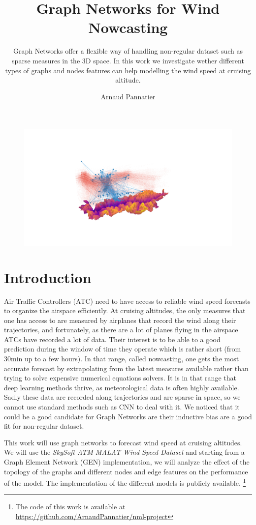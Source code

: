 \documentclass[a4paper,10pt]{article}
\title{Graph Networks for Wind Nowcasting}
\subtitle{ Graph Networks offer a flexible way of handling non-regular dataset such as sparse measures in the 3D space. In this work we investigate wether different types of graphs and nodes features can help modelling the wind speed at cruising altitude.}
\author{Arnaud Pannatier}
\begin{document}
\maketitle

\begin{figure}[htbp]
  \centering
  \includegraphics[trim={350 200 450 150},clip,width=\textwidth]{figs/south-gen.png}
\end{figure}

\newpage
\section{Introduction}
Air Traffic Controllers (ATC) need to have access to reliable wind speed forecasts to organize the airspace efficiently. At cruising altitudes, the only measures that one has access to are measured by airplanes that record the wind along their trajectories, and fortunately, as there are a lot of planes flying in the airspace ATCs have recorded a lot of data. Their interest is to be able to a good prediction during the window of time they operate which is rather short (from 30min up to a few hours). In that range, called nowcasting, one gets the most accurate forecast by extrapolating from the latest measures available rather than trying to solve expensive numerical equations solvers.
It is in that range that deep learning methods thrive, as meteorological data is often highly available. Sadly these data are recorded along trajectories and are sparse in space, so we cannot use standard methods such as CNN to deal with it. We noticed that it could be a good candidate for Graph Networks are their inductive bias are a good fit for non-regular dataset.

This work will use graph networks to forecast wind speed at cruising altitudes. We will use the \textit{SkySoft ATM MALAT Wind Speed Dataset} \cite{skysoft2021dataset} and starting from a Graph Element Network (GEN) \cite{alet2019gen} implementation, we will analyze the effect of the topology of the graphs and different nodes and edge features on the performance of the model. The implementation of the different models is publicly available. \footnote{The code of this work is available at \url{https://github.com/ArnaudPannatier/nml-project}}
\end{document}
